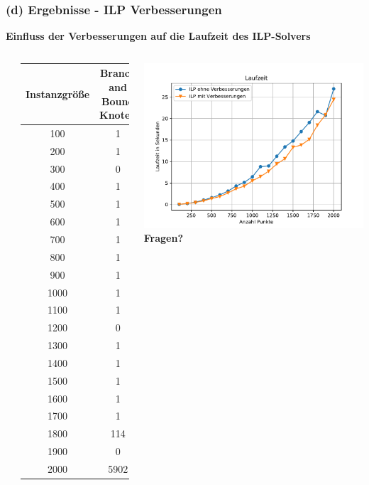 \documentclass[aspectratio=169]{beamer}
\begin{document}

\begin{frame}
	\frametitle{(d) Ergebnisse - ILP Verbesserungen}
	\textbf{Einfluss der Verbesserungen auf die Laufzeit des ILP-Solvers}
	\begin{columns}[c] %
	
	\textbf{}\\
	
		\begin{table}
		\tiny
		\begin{tabular}{cc}
			\toprule
			Instanzgröße & Branch and Bound Knoten \\
			\midrule
			100 & 1 \\
			200 & 1 \\
			300 & 0 \\
			400 & 1 \\
			500 & 1 \\
			600 & 1 \\
			700 & 1 \\
			800 & 1 \\
			900 & 1 \\
			1000 & 1 \\
			1100 & 1 \\
			1200 & 0 \\
			1300 & 1 \\
			1400 & 1 \\
			1500 & 1 \\
			1600 & 1 \\
			1700 & 1 \\
			1800 & 114 \\
			1900 & 0 \\
			2000 & 5902 \\
			\bottomrule
		\end{tabular}
	\end{table}%
	
	
	\includegraphics[scale=.45]{laufzeit_ilp_verbesserung.pdf}
	\pause
	\textbf{Fragen?}
	\end{columns}
\end{frame}

\end{document}
